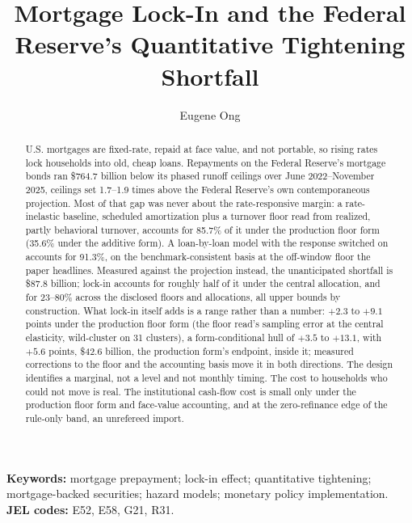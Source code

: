 \documentclass[12pt]{article}
\title{Mortgage Lock-In and the Federal Reserve's Quantitative Tightening Shortfall}
\author{Eugene Ong}
\affil{Carnegie Mellon University}
\date{}
\begin{document}
\maketitle
\begin{abstract}
\noindent U.S. mortgages are fixed-rate, repaid at face value, and not portable, so rising rates lock households into old, cheap loans. Repayments on the Federal Reserve's mortgage bonds ran \$764.7 billion below its phased runoff ceilings over June 2022--November 2025, ceilings set 1.7--1.9 times above the Federal Reserve's own contemporaneous projection. Most of that gap was never about the rate-responsive margin: a rate-inelastic baseline, scheduled amortization plus a turnover floor read from realized, partly behavioral turnover, accounts for 85.7\% of it under the production floor form (35.6\% under the additive form). A loan-by-loan model with the response switched on accounts for 91.3\%, on the benchmark-consistent basis at the off-window floor the paper headlines. Measured against the projection instead, the unanticipated shortfall is \$87.8 billion; lock-in accounts for roughly half of it under the central allocation, and for 23--80\% across the disclosed floors and allocations, all upper bounds by construction. What lock-in itself adds is a range rather than a number: $+2.3$ to $+9.1$ points under the production floor form (the floor read's sampling error at the central elasticity, wild-cluster on 31 clusters), a form-conditional hull of $+3.5$ to $+13.1$, with $+5.6$ points, \$42.6 billion, the production form's endpoint, inside it; measured corrections to the floor and the accounting basis move it in both directions. The design identifies a marginal, not a level and not monthly timing. The cost to households who could not move is real. The institutional cash-flow cost is small only under the production floor form and face-value accounting, and at the zero-refinance edge of the rule-only band, an unrefereed import.
\end{abstract}

\vspace{0.5\baselineskip}
{\footnotesize\noindent\textbf{Keywords:} mortgage prepayment; lock-in effect; quantitative tightening; mortgage-backed securities; hazard models; monetary policy implementation.\\
\textbf{JEL codes:} E52, E58, G21, R31.\par}
\newpage
\end{document}
